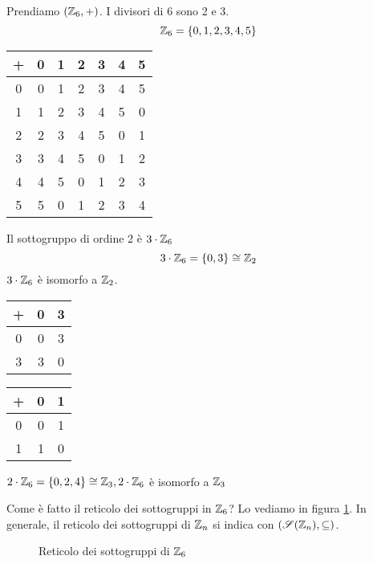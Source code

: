 \begin{exmp}
Prendiamo $(\mathbb{Z}_6, +)$. I divisori di 6 sono 2 e 3.
\[
\mathbb{Z}_6 = \{ 0, 1, 2, 3, 4, 5 \}
\]
\begin{table}[ht]
\centering
\begin{tabular}{c|*{6}{c}}
+ & 0 & 1 & 2 & 3 & 4 & 5 \\
\hline
0 & 0 & 1 & 2 & 3 & 4 & 5 \\
1 & 1 & 2 & 3 & 4 & 5 & 0 \\
2 & 2 & 3 & 4 & 5 & 0 & 1 \\
3 & 3 & 4 & 5 & 0 & 1 & 2 \\
4 & 4 & 5 & 0 & 1 & 2 & 3 \\
5 & 5 & 0 & 1 & 2 & 3 & 4
\end{tabular}
\end{table}

Il sottogruppo di ordine 2 \`e $3 \cdot \mathbb{Z}_6$
\[
3 \cdot \mathbb{Z}_6 = \{ 0, 3 \} \cong \mathbb{Z}_2
\]
$3 \cdot \mathbb{Z}_6$ \`e isomorfo a $\mathbb{Z}_2$.
\begin{center}
\begin{tabular}{c|cc}
+ & 0 & 3 \\
\hline
0 & 0 & 3 \\
3 & 3 & 0
\end{tabular}
\qquad
\begin{tabular}{c|cc}
+ & 0 & 1 \\
\hline
0 & 0 & 1 \\
1 & 1 & 0
\end{tabular}
\end{center}

$2 \cdot \mathbb{Z}_6 = \{ 0, 2, 4 \} \cong \mathbb{Z}_3, 2 \cdot \mathbb{Z}_6$ \`e isomorfo a $\mathbb{Z}_3$

Come \`e fatto il reticolo dei sottogruppi in $\mathbb{Z}_6$? Lo vediamo in figura \ref{fig:reticolo_sottogruppi_z6}.
In generale, il reticolo dei sottogruppi di $\mathbb{Z}_n$ si indica con $(\mathscr{S}(\mathbb{Z}_n), \subseteq)$.

\begin{figure}
\centering
{}
\caption{Reticolo dei sottogruppi di $\mathbb{Z}_6$\label{fig:reticolo_sottogruppi_z6}}
\end{figure}


\end{exmp}
